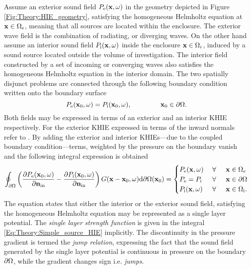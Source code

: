 Assume an exterior sound field $P_{\mathrm{e}}(\mathbf{x},\omega)$ in the geometry depicted in Figure \ref{Fig:Theory:HIE_geometry}, satisfying the homogeneous Helmholtz equation at $\mathbf{x} \in \Omega_{\mathrm{e}}$, meaning that all sources are located within the enclosure. 
The exterior wave field is the combination of radiating, or diverging waves. 
On the other hand assume an interior sound field $P_{\mathrm{i}}(\mathbf{x},\omega)$ inside the enclosure $\mathbf{x} \in \Omega_i$, induced by a sound source located outside the volume of investigation.
The interior field constructed by a set of incoming or converging waves also satisfies the homogeneous Helmholtz equation in the interior domain.
The two spatially disjunct problems are connected through the following boundary condition written onto the boundary surface
\begin{equation}
P_{\mathrm{e}}(\vxo,\omega) = P_{\mathrm{i}}(\vxo,\omega), \hspace{15mm} \vxo \in \dO.
\end{equation}
Both fields may be expressed in terms of an exterior and an interior KHIE respectively.
For the exterior KHIE expressed in terms of the inward normals refer to \cite[eq. 8.30]{Williams1999}.
By adding the exterior and interior KHIEs---due to the coupled boundary condition---terms, weighted by the pressure on the boundary vanish and the following integral expression is obtained \cite{Courant1962, Kellogg1967, Williams1999}
\begin{equation}
\oint_{\partial \Omega} 
\left(
\frac{\partial P_{\mathrm{e}}(\mathbf{x}_0,\omega)}{\partial \mathbf{n}_{\mathrm{in}}} - \frac{\partial P_{\mathrm{i}}(\mathbf{x}_0,\omega)}{\partial \mathbf{n}_{\mathrm{in}}} 
\right)
G(\mathbf{x}-\mathbf{x}_0,\omega) 
\mathrm{d} \partial \Omega ( \mathbf{x}_0)
= 
\begin{cases} 
P_{\mathrm{e}}(\mathbf{x},\omega)           & \hspace{1mm} \forall \hspace{5mm}  \mathbf{x} \in \Omega_e  	   \\
P_{\mathrm{e}}=P_{\mathrm{i}} & \hspace{1mm} \forall \hspace{5mm}         \mathbf{x} \in \partial \Omega  \\
P_{\mathrm{i}}(\mathbf{x},\omega) 			& \hspace{1mm} \forall \hspace{5mm}   \mathbf{x} \in \Omega_{\mathrm{i}}.
\end{cases}
\label{Eq:Theory:Simple_source_HIE}
\end{equation}
The equation states that either the interior or the exterior sound field, satisfying the homogeneous Helmholtz equation may be represented as a single layer potential.
The \emph{single layer strength function} is given in the integral \eqref{Eq:Theory:Simple_source_HIE} implicitly.
The discontinuity in the pressure gradient is termed the \emph{jump relation}, expressing the fact that the sound field generated by the single layer potential is continuous in pressure on the boundary $\partial \Omega$, while the gradient changes sign i.e. \emph{jumps}.

